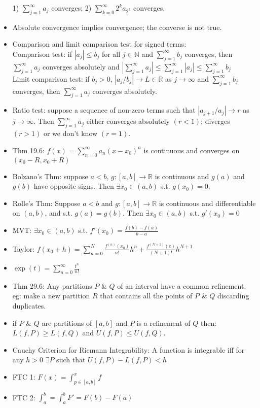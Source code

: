 \documentclass[10pt]{article}
\begin{document}
\begin{multicols}{2}
\begin{itemize}
    1) $\sum^{\infty}_{j=1}a_{j}$ converges; 2) $\sum^{\infty}_{k=0}2^{k}a_{2^{k}}$ converges.
    \item Absolute convergence implies convergence; the converse is not true.
    \item Comparison and limit comparison test for signed terms:\\
    Comparison test: if $|a_{j}|\leq b_{j}$ for all $j\in\mathbb{N}$ and $\sum^{\infty}_{j=1}b_{j}$ converges, then $\sum^{\infty}_{j=1}a_{j}$ converges absolutely and $\left|\sum^{\infty}_{j=1}a_{j}\right|\leq\sum^{\infty}_{j=1}|a_{j}|\leq\sum^{\infty}_{j=1}b_{j}$\\
    Limit comparison test: if $b_{j}>0$, $|a_{j}/b_{j}|\to L\in\mathbb{R}$ as $j\to\infty$ and $\sum^{\infty}_{j=1}b_{j}$ converges, then $\sum^{\infty}_{j=1}a_{j}$ converges absolutely.
    \item Ratio test: suppose a sequence of non-zero terms such that $|a_{j+1}/a_{j}|\to r$ as $j\to\infty$. Then $\sum^{\infty}_{j=1}a_{j}$ either converges absolutely $(r<1)$; diverges $(r>1)$ or we don't know $(r=1)$.
    \item Thm 19.6: $f(x)=\sum^{\infty}_{n=0}a_{n}(x-x_{0})^{n}$ is continuous and converges on $(x_{0}-R,x_{0}+R)$
    \item Bolzano's Thm: suppose $a<b$, $g:[a,b]\to\mathbb{R}$ is continuous and $g(a)$ and $g(b)$ have opposite signs. Then $\exists x_{0}\in(a,b)$ s.t. $g(x_{0})=0$.
    \item Rolle's Thm: Suppose $a<b$ and $g:[a,b]\to\mathbb{R}$ is continuous and differentiable on $(a,b)$, and s.t. $g(a)=g(b)$. Then $\exists x_{0}\in(a,b)$ s.t. $g'(x_{0})=0$
    \item MVT: $\exists x_{0}\in(a,b)$ s.t. $f'(x_{0})=\frac{f(b)-f(a)}{b-a}$
    \item Taylor: $f(x_{0}+h)=\sum^{N}_{n=0}\frac{f^{(n)}(x_{0})}{n!}h^{n}+\frac{f^{(N+1)}(c)}{(N+1)!}h^{N+1}$
    \item $\exp(t)=\sum^{\infty}_{n=0}\frac{t^{n}}{n!}$
    \item Thm 29.6: Any partitions $P$ \& $Q$ of an interval have a common refinement. eg: make a new partition $R$ that contains all the points of $P$ \& $Q$ discarding duplicates.
    \item if $P$ \& $Q$ are partitions of $[a,b]$ and $P$ is a refinement of $Q$ then: $L(f,P)\geq L(f,Q)$ and $U(f,P)\leq U(f,Q)$.
    \item Cauchy Criterion for Riemann Integrability: A function is integrable iff for any $h>0$ $\exists P$ such that $U(f,P)-L(f,P)<h$
    \item FTC 1: $F(x)=\int^{x}_{p\in[a,b]}f$
    \item FTC 2: $\int^{b}_{a}=\int^{b}_{a}F'=F(b)-F(a)$
\end{itemize}
\end{multicols}
\newpage
{}
\end{document}
